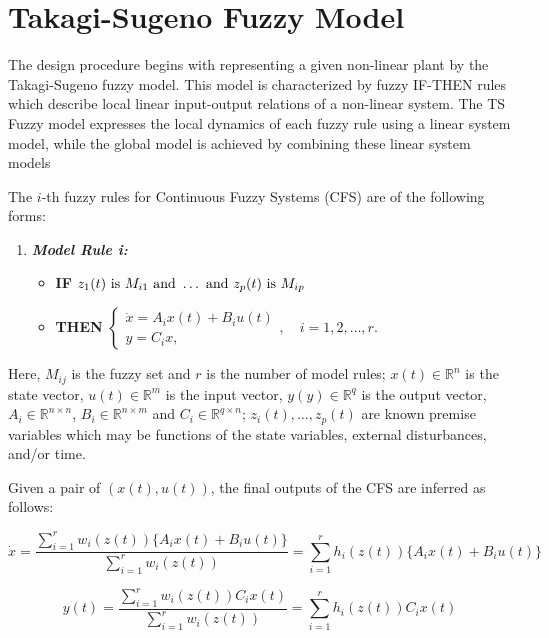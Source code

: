 \section*{Takagi-Sugeno Fuzzy Model}

The design procedure begins with representing a given non-linear plant by the Takagi-Sugeno fuzzy model. This model is characterized by fuzzy IF-THEN rules which describe local linear input-output relations of a non-linear system. The TS Fuzzy model expresses the local dynamics of each fuzzy rule using a linear system model, while the global model is achieved by combining these linear system models 

The $i$-th fuzzy rules for Continuous Fuzzy Systems (CFS) are of the following forms:

\begin{enumerate}
  \item[] \textit{\textbf{Model Rule i:}}
  \begin{itemize}
      \item[] \textbf{IF} $z_1(t) \ \mathrm{is}\  M_{i1} \ \mathrm{and}\  \dots \ \mathrm{and}\  z_p(t) \ \mathrm{is}\  M_{ip}$
      \item[] \textbf{THEN} $\begin{cases}
        \dot x = A_i x(t) + B_i u(t) \\
        y = C_i x,
      \end{cases}, \hspace{12pt} i = 1, 2, \dots, r.$
  \end{itemize}
\end{enumerate}

Here, $M_{ij}$ is the fuzzy set and $r$ is the number of model rules; $x(t) \in \mathbb{R}^n$ is the state vector, $u(t) \in \mathbb{R}^m$ is the input vector, $y(y) \in \mathbb{R}^q$ is the output vector, $A_i \in \mathbb{R}^{n\times n}$, $B_i \in \mathbb{R}^{n\times m}$ and $C_i \in \mathbb{R}^{q\times n}$; $z_i(t), \dots, z_p(t)$ are known premise variables which may be functions of the state variables, external disturbances, and/or time.

Given a pair of $(x(t), u(t))$, the final outputs of the CFS are inferred as follows:

\begin{equation}
  \dot x = \frac{\sum\limits_{i=1}^{r} w_i(z(t))\{A_i x(t) + B_i u(t)\}}
  {\sum\limits_{i=1}^{r} w_i(z(t))} =
  \sum\limits_{i=1}^{r} h_i(z(t))\{A_i x(t) + B_i u(t)\}
\end{equation}

\begin{equation}
  y(t) = \frac{\sum\limits_{i=1}^{r} w_i(z(t)) C_i x(t)}
  {\sum\limits_{i=1}^{r} w_i(z(t))} =
  \sum\limits_{i=1}^{r} h_i(z(t))C_i x(t)
\end{equation}

